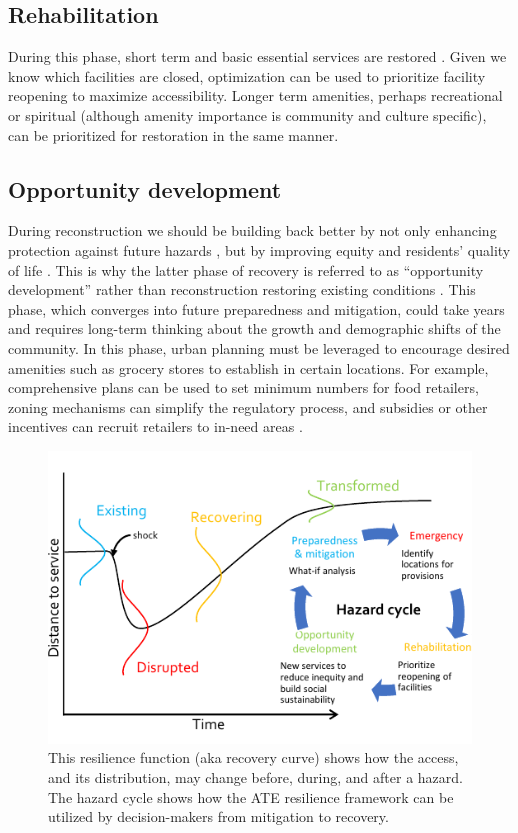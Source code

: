 \documentclass[9pt,twocolumn,twoside,lineno]{pnas-new}
\begin{document}
\subsection*{Rehabilitation} 
During this phase, short term and basic essential services are restored \cite{Resendiz-Vazquez2019-ol}. 
Given we know which facilities are closed, optimization can be used to prioritize facility reopening to maximize accessibility. 
Longer term amenities, perhaps recreational or spiritual (although amenity importance is community and culture specific), can be prioritized for restoration in the same manner.

\subsection*{Opportunity development}
During reconstruction we should be building back better \cite{Resendiz-Vazquez2019-ol} by not only enhancing protection against future hazards \cite{Platt2019-lx}, but by improving equity and residents’ quality of life \cite{Pantelic1991-qu}. 
This is why the latter phase of recovery is referred to as “opportunity development” rather than reconstruction restoring existing conditions \cite{Resendiz-Vazquez2019-ol,Pantelic1991-qu}. 
This phase, which converges into future preparedness and mitigation, could take years and requires long-term thinking about the growth and demographic shifts of the community. 
In this phase, urban planning must be leveraged to encourage desired amenities such as grocery stores to establish in certain locations. 
For example, comprehensive plans can be used to set minimum numbers for food retailers, zoning mechanisms can simplify the regulatory process, and subsidies or other incentives can recruit retailers to in-need areas \cite{Raja2010-cm, Raja2008-wx}. 

\begin{figure}
    \centering
    \includegraphics[width=\linewidth]{report/fig/Figure_hazardCycle.pdf}
    \caption{This resilience function (aka recovery curve) shows how the access, and its distribution, may change before, during, and after a hazard. The hazard cycle shows how the ATE resilience framework can be utilized by decision-makers from mitigation to recovery.}
    \label{fig:haz_cycle}
\end{figure}
\end{document}
